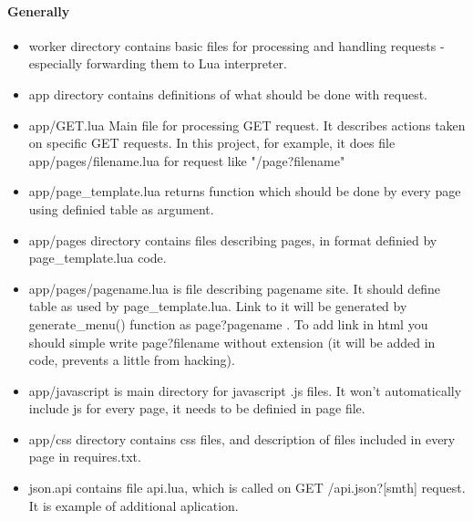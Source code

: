 \documentclass[a4paper]{article}
\begin{document}
\paragraph{Generally}
	\begin{itemize}
		\item{worker} directory contains basic files for processing and 
handling requests - especially forwarding them to Lua interpreter.
		\item{app} directory contains definitions of what should be done
with request.
		\item{app/GET.lua} Main file for processing GET request. It
describes actions taken on specific GET requests. In this project, for
example, it does file app/pages/filename.lua for request like
"/page?filename"
		\item{app/page\_template.lua} returns function which should be done
by every page using definied table as argument.
		\item{app/pages} directory contains files describing pages, in
format definied by page\_template.lua code.
		\item{app/pages/pagename.lua} is file describing pagename site.
It should define table as used by page\_template.lua. Link to it will be
generated by generate\_menu() function as page?pagename . 
To add link in html you should simple write page?filename without
extension (it will be added in code, prevents a little from hacking).
		\item{app/javascript} is main directory for javascript .js files.
It won't automatically include js for every page, it needs to be definied
in page file.
		\item{app/css} directory contains css files, and description of
files included in every page in requires.txt.
		\item{json.api} contains file api.lua, which is called on GET
/api.json?[smth] request. It is example of additional aplication.
	\end{itemize}
\end{document}
